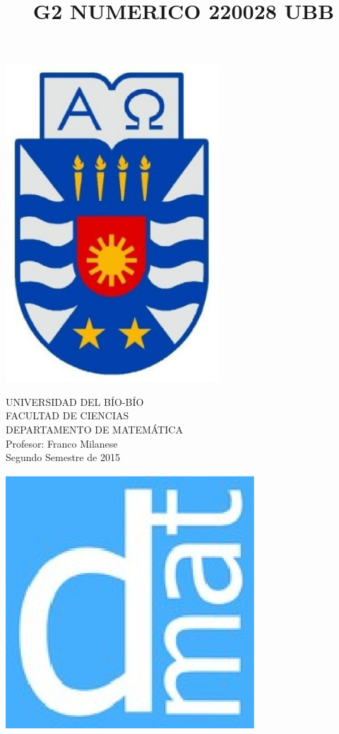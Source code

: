 \documentclass[11pt]{article}
\begin{document}
\title{G2 NUMERICO 220028 UBB}

{\begin{minipage}{2cm}
\hspace*{1cm}\includegraphics[width=0.6\textwidth]{escubo-ubb.eps}
\end{minipage}
\begin{minipage}{12cm}
\small
{\bf \rm 
{
\begin{center}
{\footnotesize UNIVERSIDAD DEL B\'IO-B\'IO} \\
{\scriptsize FACULTAD DE CIENCIAS}  \\
{\scriptsize DEPARTAMENTO DE MATEM\'ATICA}  \\
{\scriptsize Profesor:  Franco Milanese}\\
{\scriptsize Segundo Semestre de 2015}
\end{center}
}}
\end{minipage}}
{\begin{minipage}{2cm}
\hspace*{-0.5cm}\vspace*{-0.05cm}\includegraphics[width=0.7\textwidth]{escudo-dmat.eps}
\end{minipage}}
\end{document}
